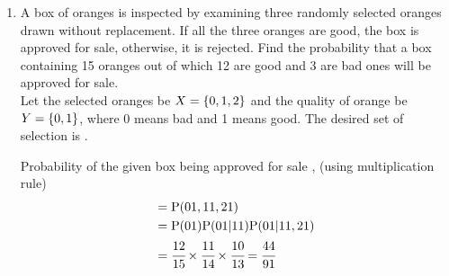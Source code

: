 \documentclass[../assign.tex]{subfiles}
\begin{document}
\begin{enumerate}[label=13.\arabic{enumi}.\arabic{enumii}]

\setcounter{enumi}{1}
\setcounter{enumii}{3}
\item A box of oranges is inspected by examining three randomly selected oranges drawn without replacement. If all the three oranges are good, the box is approved for sale, otherwise, it is rejected. Find the probability that a box containing 15 oranges out of which 12 are good and 3 are bad ones will be approved for sale.\\[1ex]
	\solution
		Let the selected oranges be $X = \left\{0,1,2\right\}$ and the quality of orange be $Y = \left\{0,1\right\}$, where 0 means bad and 1 means good. The desired set of selection is .\\[-0.7cm]

	\begin{table}[h!]
	\small
	\centering
	
	\end{table}

		Probability of the given box being approved for sale , (using multiplication rule)	%
	\begin{align}
		=& \; \text{P}(01 , 11 , 21) \\
		=& \; \text{P}(01)\text{P}(01|11)\text{P}(01|11 , 21) \\
		=& \; \cfrac{12}{15}\times \cfrac{11}{14}\times \cfrac{10}{13}= \cfrac{44}{91}
	\end{align}

\end{enumerate}
\end{document}
